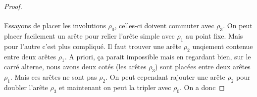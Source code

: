 \begin{proof}
  \begin{figure}[H]
    \begin{center}
      \caption{}
    \end{center}
  \end{figure}

  \paragraph{}
  Essayons de placer les involutions $\rho_0$, celles-ci doivent commuter avec $\rho_3$. On peut placer facilement un arête pour relier l'arête simple avec $\rho_1$ au point fixe. Mais pour l'autre c'est plus compliqué. Il faut trouver une arête $\rho_2$ unqiement contenue entre deux arêtes $\rho_1$. A priori, ça parait impossible mais en regardant bien, sur le carré alterne, nous avons deux cotés (les arêtes $\rho_3$) sont placées entre deux arêtes $\rho_1$. Mais ces arêtes ne sont pas $\rho_2$. On peut cependant rajouter une arête $\rho_2$ pour doubler l'arête $\rho_3$ et maintenant on peut la tripler avec $\rho_0$. On a donc


\end{proof}
